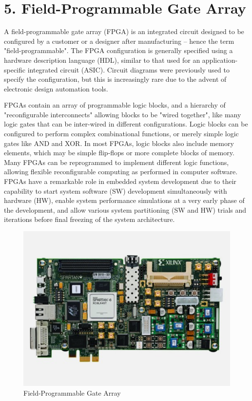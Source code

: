 \section*{5. Field-Programmable Gate Array}

A field-programmable gate array (FPGA) is an integrated circuit designed to be configured by a customer or a designer after manufacturing – hence the term "field-programmable". The FPGA configuration is generally specified using a hardware description language (HDL), similar to that used for an application-specific integrated circuit (ASIC). Circuit diagrams were previously used to specify the configuration, but this is increasingly rare due to the advent of electronic design automation tools.\vspace{.3cm}

FPGAs contain an array of programmable logic blocks, and a hierarchy of "reconfigurable interconnects" allowing blocks to be "wired together", like many logic gates that can be inter-wired in different configurations. Logic blocks can be configured to perform complex combinational functions, or merely simple logic gates like AND and XOR. In most FPGAs, logic blocks also include memory elements, which may be simple flip-flops or more complete blocks of memory. Many FPGAs can be reprogrammed to implement different logic functions, allowing flexible reconfigurable computing as performed in computer software. FPGAs have a remarkable role in embedded system development due to their capability to start system software (SW) development simultaneously with hardware (HW), enable system performance simulations at a very early phase of the development, and allow various system partitioning (SW and HW) trials and iterations before final freezing of the system architecture.\vspace{.3cm}

\begin{figure}[h]
	\centering
	\includegraphics[width=0.7\linewidth]{images/1586365527662}
	\captionsetup{labelformat=empty}
	\caption{Field-Programmable Gate Array}
\end{figure}



